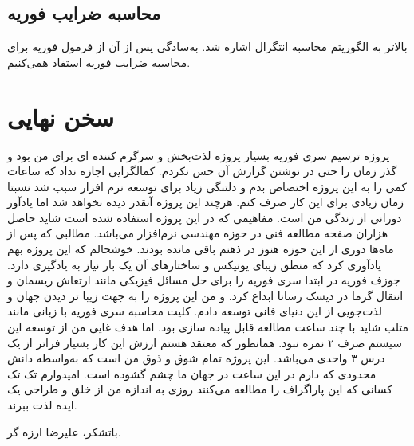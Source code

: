 \documentclass[a4paper]{report}
\begin{document}
\subsection{محاسبه ضرایب فوریه}
بالاتر به الگوریتم محاسبه انتگرال اشاره شد. به‌سادگی پس از آن از فرمول فوریه برای محاسبه ضرایب فوریه استفاد همی‌کنیم.

\section{سخن نهایی}
پروژه ترسیم سری فوریه بسیار پروژه لذت‌بخش و سرگرم کننده ای برای من بود و گذر زمان را حتی در نوشتن گزارش آن حس نکردم.
کمالگرایی اجازه نداد که ساعات کمی را به این پروژه اختصاص بدم و دلتنگی زیاد برای توسعه نرم افزار سبب شد نسبتا زمان زیادی برای
این کار صرف کنم. هرچند این پروژه آنقدر دیده نخواهد شد اما یادآور دورانی از زندگی من است. مفاهیمی که در این پروژه استفاده شده است
شاید حاصل هزاران صفحه مطالعه فنی در حوزه مهندسی نرم‌افزار می‌باشد. مطالبی که پس از ماه‌ها دوری از این حوزه هنوز در ذهنم باقی مانده بودند.
خوشحالم که این پروژه بهم یادآوری کرد که منطق زیبای یونیکس و ساختارهای آن یک بار نیاز به یادگیری دارد.
جوزف فوریه در ابتدا سری فوریه را برای حل مسائل فیزیکی مانند ارتعاش ریسمان و انتقال گرما در دیسک رسانا ابداع کرد.
و من این پروژه را به جهت زیبا تر دیدن جهان و لذت‌جویی از این دنیای فانی توسعه دادم. کلیت محاسبه سری فوریه با زبانی مانند متلب
شاید با چند ساعت مطالعه قابل پیاده سازی بود. اما هدف غایی من از توسعه این سیستم صرف ۲ نمره نبود. همانطور که معتقد هستم
ارزش این کار بسیار فراتر از یک درس ۳ واحدی می‌باشد. این پروژه تمام شوق و ذوق من است که به‌واسطه دانش محدودی که دارم
در این ساعت در جهان ما چشم گشوده است. امیدوارم تک تک کسانی که این پاراگراف را مطالعه می‌کنند روزی به اندازه من از خلق و طراحی
یک ایده لذت ببرند.

باتشکر، علیرضا ارزه گر.
\end{document}
